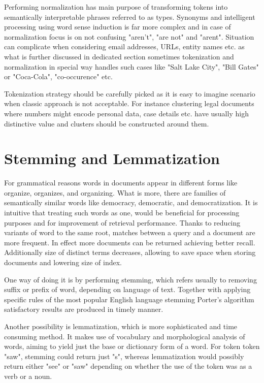 \documentclass[a4paper, 12pt, oneside]{Thesis} %
\begin{document}
Performing normalization has main purpose of transforming tokens into semantically interpretable phrases referred to as types. Synonyms and intelligent processing using word sense induction is far more complex and in case of normalization focus is on not confusing "aren't", "are not" and "arent". Situation can complicate when considering email addresses, URLs, entity names etc. as what is further discussed in dedicated section sometimes tokenization and normalization in special way handles such cases like "Salt Lake City", "Bill Gates" or "Coca-Cola", "co-occurence" etc.

Tokenization strategy should be carefully picked as it is easy to imagine scenario when classic approach is not acceptable. For instance clustering legal documents where numbers might encode personal data, case details etc. have usually high distinctive value and clusters should be constructed around them.

\section{Stemming and Lemmatization} For grammatical reasons words in documents appear in different forms like organize, organizes, and organizing. What is more, there are families of semantically similar words like democracy, democratic, and democratization. It is intuitive that treating such words as one, would be beneficial for processing purposes and for improvement of retrieval performance. Thanks to reducing variants of word to the same root, matches between a query and a document are more frequent. In effect more documents can be returned achieving better recall. Additionally size of distinct terms decreases, allowing to save space when storing documents and lowering size of index.

One way of doing it is by performing stemming, which refers usually to removing suffix or prefix of word, depending on language of text. Together with applying specific rules of the most popular English language stemming Porter's algorithm \cite{porter1980algorithm} satisfactory results are produced in timely manner. 

Another possibility is lemmatization, which is more sophisticated and time consuming method. It makes use of vocabulary and morphological analysis of words, aiming to yield just the base or dictionary form of a word. For token token "saw", stemming could return just "s", whereas lemmatization would possibly return either "see" or "saw" depending on whether the use of the token was as a verb or a noun.
\end{document}
